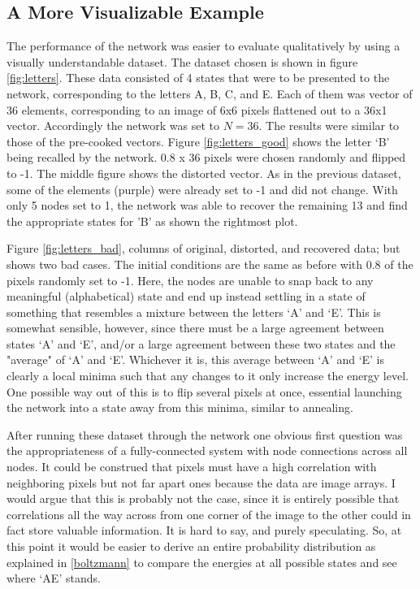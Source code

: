 \documentclass[11pt]{article}
\begin{document}
	\subsection{A More Visualizable Example}
	The performance of the network was easier to evaluate qualitatively by using a visually understandable dataset.
	The dataset chosen is shown in figure \ref{fig:letters}. 
	These data consisted of 4 states that were to be presented to the network, corresponding to the letters A, B, C, and E.
	Each of them was vector of 36 elements, corresponding to an image of 6x6 pixels flattened out to a 36x1 vector.
	Accordingly the network was set to $N=36$. The results were similar to those of the pre-cooked vectors. 
	Figure \ref{fig:letters_good} shows the letter `B' being recalled by the network. 0.8 x 36 pixels were chosen randomly and flipped to -1. 
	The middle figure shows the distorted vector. As in the previous dataset, some of the elements (purple) were already set to -1 and did not change.
	With only 5 nodes set to 1, the network was able to recover the remaining 13 and find the appropriate states for 'B' as shown the rightmost plot.
	
	Figure \ref{fig:letters_bad}, columns of original, distorted, and recovered data; but shows two bad cases.
	The initial conditions are the same as before with 0.8 of the pixels randomly set to -1.
	Here, the nodes are unable to snap back to any meaningful (alphabetical) state and end up instead settling in a state of something that resembles a mixture between the letters `A' and `E'.
	This is somewhat sensible, however, since there must be a large agreement between states `A' and `E', and/or a large agreement between these two states and the "average" of `A' and `E'.
	Whichever it is, this average between `A' and `E' is clearly a local minima such that any changes to it only increase the energy level. 
	One possible way out of this is to flip several pixels at once, essential launching the network into a state away from this minima, similar to annealing.
	
	After running these dataset through the network one obvious first question was the appropriateness of a fully-connected system with node connections across all nodes.	
	 It could be construed that pixels must have a high correlation with neighboring pixels but not far apart ones because the data are image arrays. 
	 I would argue that this is probably not the case, since it is entirely possible that correlations all the way across from one corner of the image to the other could in fact store valuable information.
	It is hard to say, and purely speculating. So, at this point it would be easier to derive an entire probability distribution as explained in \ref{boltzmann} to compare the energies at all possible states and see where `AE' stands.
\end{document}
